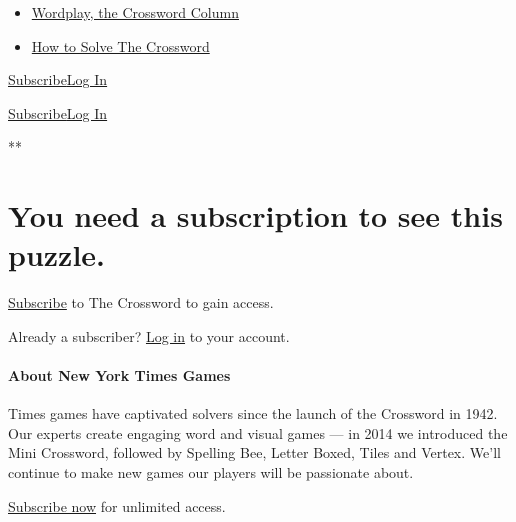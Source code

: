 \begin{itemize}
\tightlist
\item
  \href{https://www.nytimes.com/column/wordplay}{Wordplay, the Crossword
  Column}
\item
  \href{https://www.nytimes.com/guides/crosswords/how-to-solve-a-crossword-puzzle}{How
  to Solve The Crossword}
\end{itemize}

\href{https://www.nytimes.com/subscription/games?campaignId=9HH7K}{Subscribe}\href{https://myaccount.nytimes.com/auth/login?application=crosswords\&asset=navigation-drawer\&client_id=games\&redirect_uri=\&response_type=cookie}{Log
In}

\href{https://www.nytimes.com/subscription/games?campaignId=9JF99}{Subscribe}\href{https://myaccount.nytimes.com/auth/login?application=crosswords\&asset=navigation-bar\&client_id=games\&redirect_uri=\&response_type=cookie}{Log
In}

**

\hypertarget{you-need-a-subscription-to-see-this-puzzle}{%
\section{You need a subscription to see this
puzzle.}\label{you-need-a-subscription-to-see-this-puzzle}}

\href{https://www.nytimes.com/subscription/games?campaignId=4QHQ8}{Subscribe}
to The Crossword to gain access.

Already a subscriber?
\href{https://myaccount.nytimes.com/auth/login?application=crosswords\&asset=daily-crossword\&client_id=games\&redirect_uri=\&response_type=cookie}{Log
in} to your account.

\hypertarget{about-new-york-times-games}{%
\paragraph{About New York Times
Games}\label{about-new-york-times-games}}

Times games have captivated solvers since the launch of the Crossword in
1942. Our experts create engaging word and visual games --- in 2014 we
introduced the Mini Crossword, followed by Spelling Bee, Letter Boxed,
Tiles and Vertex. We'll continue to make new games our players will be
passionate about.

\href{https://www.nytimes.com/subscription/games?campaignId=9W9LL}{Subscribe
now} for unlimited access.

